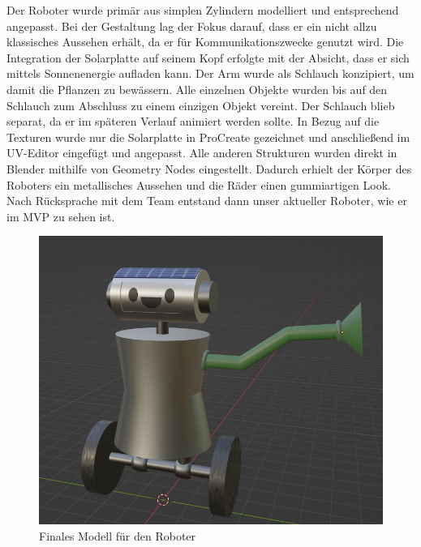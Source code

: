 Der Roboter wurde primär aus simplen Zylindern modelliert und entsprechend angepasst. Bei der Gestaltung lag der Fokus darauf, dass er ein nicht allzu klassisches Aussehen erhält, da er für Kommunikationszwecke genutzt wird. Die Integration der Solarplatte auf seinem Kopf erfolgte mit der Absicht, dass er sich mittels Sonnenenergie aufladen kann. Der Arm wurde als Schlauch konzipiert, um damit die Pflanzen zu bewässern. Alle einzelnen Objekte wurden bis auf den Schlauch zum Abschluss zu einem einzigen Objekt vereint. Der Schlauch blieb separat, da er im späteren Verlauf animiert werden sollte. In Bezug auf die Texturen wurde nur die Solarplatte in ProCreate gezeichnet und anschließend im UV-Editor eingefügt und angepasst. Alle anderen Strukturen wurden direkt in Blender mithilfe von Geometry Nodes eingestellt. Dadurch erhielt der Körper des Roboters ein metallisches Aussehen und die Räder einen gummiartigen Look. Nach Rücksprache mit dem Team entstand dann unser aktueller Roboter, wie er im MVP zu sehen ist.
\begin{figure}[h]
	\centering
	\includegraphics[height=0.3\pageheight,keepaspectratio]{pics/10}
	\caption{Finales Modell für den Roboter}
	\label{mvpSzene}
\end{figure}

